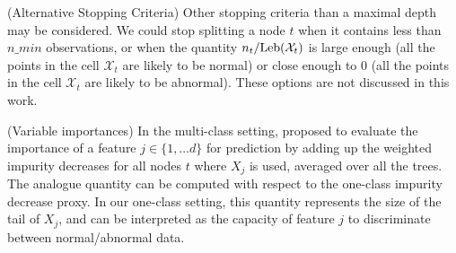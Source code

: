 \begin{remark}({\sc Alternative Stopping Criteria})
Other stopping criteria than a maximal depth may be considered. We could stop splitting a node $t$ when it contains less than $n\_min$ observations, or when the quantity $n_t/\text{Leb}(\mathcal{X}_t)$ is large enough (all the points in the cell $\mathcal{X}_t$ are likely to be normal) or close enough to $0$ (all the points in the cell $\mathcal{X}_t$ are likely to be abnormal). These options are not discussed in this work.
\end{remark}

\begin{remark}({\sc Variable importances})
In the multi-class setting, \cite{Breiman2001} proposed to evaluate the importance of a feature $j \in \{1,\ldots d\}$ for prediction by %
 adding up the weighted impurity decreases %
for all nodes $t$ where $X_j$ is used, averaged over all the trees. The analogue quantity can be computed with respect to the one-class impurity decrease proxy. %
In our one-class setting, this quantity represents the size of the tail of $X_j$, and can be interpreted as the capacity of feature $j$ to discriminate between normal/abnormal data.%
\end{remark}



